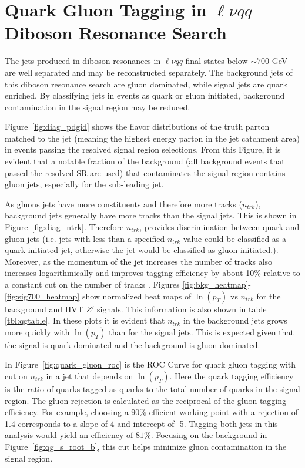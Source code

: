 \label{ch:qg}
\chapter{Quark Gluon Tagging in $\ell\nu qq$ Diboson Resonance Search}
The jets produced in diboson resonances in $\ell \nu qq$ final states below $\sim 700$ GeV are well separated and may be reconstructed separately. The background jets of this diboson resonance search are gluon dominated, while signal jets are quark enriched. By classifying jets in events as quark or gluon initiated, background contamination in the signal region may be reduced. 

Figure~\ref{fig:diag_pdgid} shows the flavor distributions of the truth parton matched to the jet (meaning the highest energy parton in the jet catchment area) in events passing the resolved signal region selections. From this Figure, it is evident that a notable fraction of the background (all background events that passed the resolved SR are used) that contaminates the signal region contains gluon jets, especially for the sub-leading jet. 

As gluons jets have more constituents and therefore more tracks ($n_{trk}$), background jets generally have more tracks than the signal jets. This is shown in Figure~\ref{fig:diag_ntrk}. Therefore $n_{trk}$, provides discrimination between quark and gluon jets (i.e. jets with less than a specified $n_{trk}$ value could be classified as a quark-initiated jet, otherwise the jet would be classified as gluon-initiated.). Moreover, as the momentum of the jet increases the number of tracks also increases logarithmically and improves tagging efficiency by about 10\% relative to a constant cut on the number of tracks \cite{nachman}. Figures \ref{fig:bkg_heatmap}-\ref{fig:sig700_heatmap} show normalized heat maps of $\ln(p_{T})$ vs $n_{trk}$ for the background and HVT $Z'$ signals. This information is also shown in table \ref{tbl:qgtable}. In these plots it is evident that $n_{trk}$ in the background jets grows more quickly with $\ln(p_{T})$ than for the signal jets. This is expected given that the signal is quark dominated and the background is gluon dominated. 

In Figure~\ref{fig:quark_gluon_roc} is the ROC Curve for quark gluon tagging with cut on $n_{trk}$ in a jet that depends on $\ln(p_{T})$. Here the quark tagging efficiency is the ratio of quarks tagged as quarks to the total number of quarks in the signal region. The gluon rejection is calculated as the reciprocal of the gluon tagging efficiency. For example, choosing a 90\% efficient working point with a rejection of 1.4 corresponds to a slope of 4 and intercept of -5. Tagging both jets in this analysis would yield an efficiency of $81\%$. Focusing on the background in Figure~\ref{fig:qg_s_root_b}, this cut helps minimize gluon contamination in the signal region.
\pagebreak

